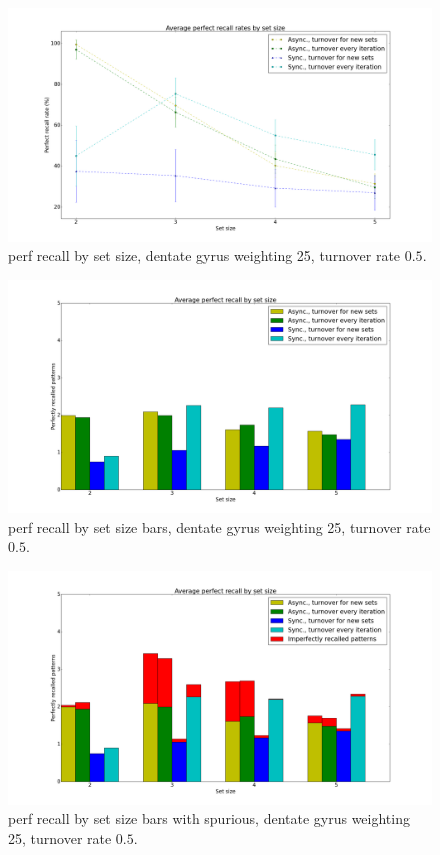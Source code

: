 \begin{figure}[h!]
    \centering
    \includegraphics[width=14cm]{fig/avg_perfect_recall_rates.png}
    \caption{perf recall by set size, dentate gyrus weighting 25, turnover rate $0.5$.}
    \label{fig:avg_perfect_recall_rates}
\end{figure}

\begin{figure}[h!]
    \centering
    \includegraphics[width=14cm]{fig/average_perfect_recall_rates_by_set_size_bars_reset_for_every_experiment}
    \caption{perf recall by set size bars, dentate gyrus weighting 25, turnover rate $0.5$.}
    \label{fig:avg_perfect_recall_bars}
\end{figure}

\begin{figure}[h!]
    \centering
    \includegraphics[width=14cm]{fig/average_perfect_recall_rates_by_set_size_bars_reset_for_every_experiment_with_imperfectly_recalled_patterns.png}
    \caption{perf recall by set size bars with spurious, dentate gyrus weighting 25, turnover rate $0.5$.}
    \label{fig:avg_perfect_recall_rates_with_spurious_bars}
\end{figure}

